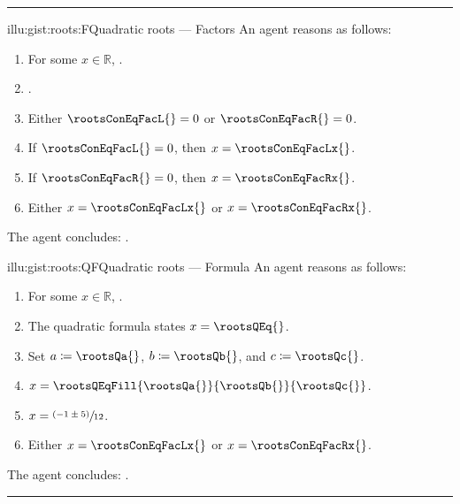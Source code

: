\documentclass[10pt]{article}
\begin{document}
\begin{note}
  \par\noindent\rule{\textwidth}{0.4pt}
  \begin{minipage}{.5\linewidth}
    \begin{rscenariox}{illu:gist:roots:F}{Quadratic roots --- Factors}%
      An agent reasons as follows:
      \begin{enumerate}[label=\arabic*., ref=\arabic*]
      \item
        \label{illu:gist:roots:F:eq}
        For some \(x \in \mathbb{R}\), \rootsConEq{}.
      \item
        \label{illu:gist:roots:F:factor}
        \rootsConEqFac{}.
      \item
        \label{illu:gist:roots:F:zero}
        Either \(\rootsConEqFacL{} = 0\) or \(\rootsConEqFacR{} = 0\).
      \item
        \label{illu:gist:roots:F:case:a}
        If \(\rootsConEqFacL{} = 0\), then \(x = \rootsConEqFacLx{}\).
      \item
        \label{illu:gist:roots:F:case:b}
        If \(\rootsConEqFacR{} = 0\), then \(x = \rootsConEqFacRx{}\).
      \item
        \label{illu:gist:roots:F:factor:done}
        Either \(x = \rootsConEqFacLx{}\) or \(x = \rootsConEqFacRx{}\).
      \end{enumerate}
      The agent concludes:
      \rootsCon{}.
    \end{rscenariox}
  \end{minipage}
  \begin{minipage}{.5\linewidth}
    \begin{rscenariox}{illu:gist:roots:QF}{Quadratic roots --- Formula}%
      An agent reasons as follows:
      \begin{enumerate}[label=\arabic*., ref=\arabic*]
      \item
        \label{illu:gist:roots:QF:eq}
        For some \(x \in \mathbb{R}\), \rootsConEq{}.
      \item
        \label{illu:gist:roots:QF:qf}
        The quadratic formula states \(x = \rootsQEq{}\).
      \item
        \label{illu:gist:roots:QF:subs}
        Set \(a \coloneq \rootsQa{}\), \(b \coloneq \rootsQb{}\), and \(c \coloneq \rootsQc{}\).%
      \item
        \label{illu:gist:roots:QF:qf-subs}
        \(x = \rootsQEqFill{\rootsQa{}}{\rootsQb{}}{\rootsQc{}}\).
      \item
        \label{illu:gist:roots:QF:qf:1}
        \(x = \sfrac{(- 1 \pm 5)}{12}\).
      \item
        \label{illu:gist:roots:QF:qf:done}
        Either \(x = \rootsConEqFacLx{}\) or \(x = \rootsConEqFacRx{}\).
      \end{enumerate}
      The agent concludes:
      \rootsCon{}.
    \end{rscenariox}
  \end{minipage}
  \par\noindent\rule{\textwidth}{0.4pt}
\end{note}
\end{document}
